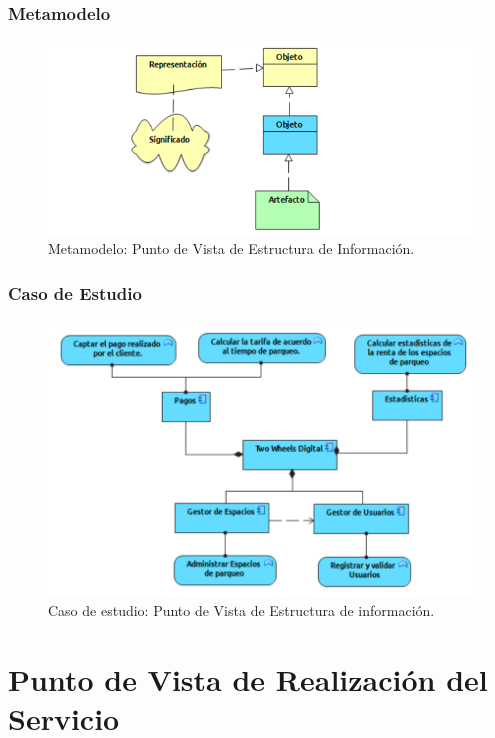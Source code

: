 \subsubsection{Metamodelo}
\begin{figure}[H]
	\centering
	\includegraphics[width=1.0\textwidth]{imagenes/Metamodelos/Tecnologia/Estructura_informacion.PDF}
	\caption{Metamodelo: Punto de Vista de Estructura de Información.}
	\label{fig:gap_analysis}
\end{figure}

\subsubsection{Caso de Estudio}


\begin{figure}[H]
	\centering
	\includegraphics[width=1.0\textwidth]{imagenes/Caso_Estudio/Tecnologia/ComAplicacion.PDF}
	\caption{Caso de estudio: Punto de Vista de Estructura de información.}
	\label{fig:gap_analysis}
\end{figure}


\section{Punto de Vista de Realización del Servicio}
